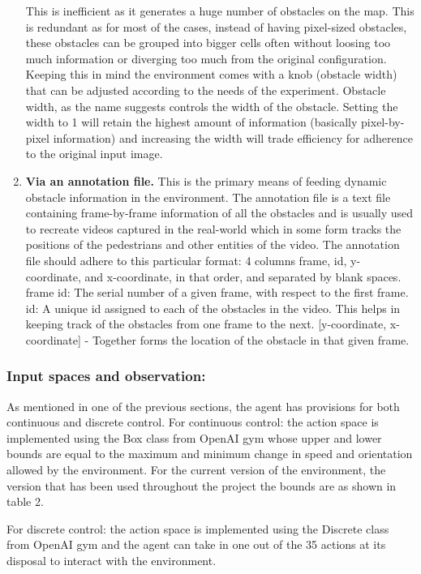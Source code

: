 \begin{enumerate}
This is inefficient as it generates a huge number of obstacles on the map.
This is redundant as for most of the cases, instead of having pixel-sized obstacles,  these obstacles can be grouped into bigger cells often without loosing too much information or diverging too much from the original configuration. Keeping this in mind the environment comes with a knob (obstacle width) that can be adjusted according to the needs of the experiment. Obstacle width, as the name suggests controls the width of the obstacle. Setting the width to 1 will retain the highest amount of information (basically pixel-by-pixel information) and increasing the width will trade efficiency for adherence to the original input image.
\item \textbf{Via an annotation file.}
This is the primary means of feeding dynamic obstacle information in the environment. 
The annotation file is a text file containing frame-by-frame information of all the obstacles and is usually used to recreate videos captured in the real-world which in some form tracks the positions of the pedestrians and other entities of the video. The annotation file should adhere to this particular format: 4 columns frame, id, y-coordinate, and x-coordinate, in that order, and separated by blank spaces.
frame id: The serial number of a given frame, with respect to the first frame.
id: A unique id assigned to each of the obstacles in the video. This helps in keeping track of the obstacles from one frame to the next.
[y-coordinate, x-coordinate] - Together forms the location of the obstacle in that given frame.
\end{enumerate}
\subsubsection*{Input spaces and observation:}
As mentioned in one of the previous sections, the agent has provisions for both continuous and discrete control.
For continuous control: the action space is implemented using the Box class from OpenAI gym whose upper and lower bounds are equal to the maximum and minimum change in speed and orientation allowed by the environment. For the current version of the environment, the version that has been used throughout the project the bounds are as shown in table 2.

For discrete control: the action space is implemented using the Discrete class from OpenAI gym and the agent can take in one out of the 35 actions at its disposal to interact with the environment.


